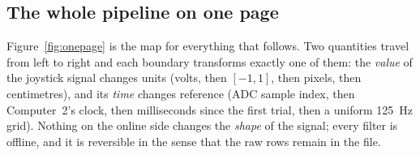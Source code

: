 \documentclass[11pt,a4paper]{article}
\begin{document}
\subsection{The whole pipeline on one page}

Figure~\ref{fig:onepage} is the map for everything that follows. Two quantities
travel from left to right and each boundary transforms exactly one of them: the
\emph{value} of the joystick signal changes units (volts, then $[-1,1]$, then
pixels, then centimetres), and its \emph{time} changes reference (ADC sample
index, then Computer~2's clock, then milliseconds since the first trial, then a
uniform 125~Hz grid). Nothing on the online side changes the \emph{shape} of the
signal; every filter is offline, and it is reversible in the sense that the raw
rows remain in the file.
\end{document}
